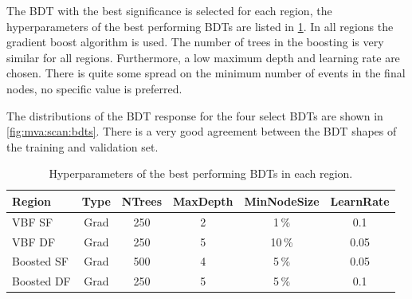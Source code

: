 The BDT with the best significance is selected for each region, the hyperparameters of the best performing BDTs are
listed in \cref{tab:mva:bestparams}.
In all regions the gradient boost algorithm is used.
The number of trees in the boosting is very similar for all regions.
Furthermore, a low maximum depth and learning rate are chosen.
There is quite some spread on the minimum number of events in the final nodes, no specific value is preferred.

The distributions of the BDT response for the four select BDTs are shown in \cref{fig:mva:scan:bdts}.
There is a very good agreement between the BDT shapes of the training and validation set.

\begin{table}[htpb]
    \centering
    \caption{Hyperparameters of the best performing BDTs in each region.}\label{tab:mva:bestparams}
    \begin{tabular}{@{}lccccc@{}}
        \toprule
        Region     & Type & NTrees & MaxDepth & MinNodeSize & LearnRate \\ \midrule
        VBF SF     & Grad & 250    & 2        & 1\,\%       & 0.1          \\
        VBF DF     & Grad & 250    & 5        & 10\,\%      & 0.05         \\
        Boosted SF & Grad & 500    & 4        & 5\,\%       & 0.05         \\
        Boosted DF & Grad & 250    & 5        & 5\,\%       & 0.1          \\
        \bottomrule
    \end{tabular}
\end{table}

